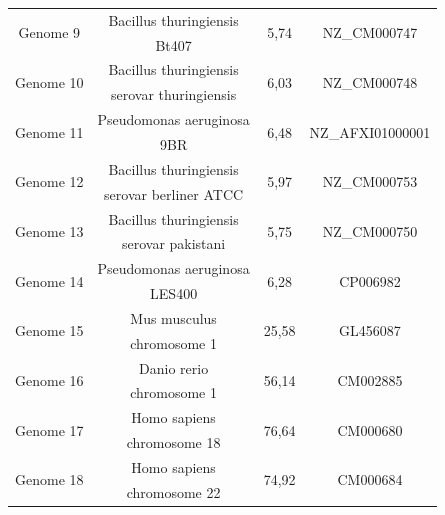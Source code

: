 \documentclass[preprint,12pt]{elsarticle}
\begin{document}
\begin{table}
\begin{center}
\begin{tabular}{c  c  c c}
\multirow{2}{*}{Genome 9}&Bacillus thuringiensis&   \multirow{2}{*}{5,74} &\multirow{2}{*}{ NZ\_CM000747 }\\    &Bt407&\\
\hline    

\multirow{2}{*}{Genome 10}&Bacillus thuringiensis& \multirow{2}{*}{6,03} &\multirow{2}{*}{ NZ\_CM000748}\\    &serovar thuringiensis& \\
\hline
    
\multirow{2}{*}{Genome 11}&Pseudomonas aeruginosa& \multirow{2}{*}{6,48} &\multirow{2}{*}{NZ\_AFXI01000001}\\    &9BR&\\
\hline
    
\multirow{2}{*}{Genome 12}&Bacillus thuringiensis&  \multirow{2}{*}{5,97} &\multirow{2}{*}{ NZ\_CM000753}\\    &serovar berliner ATCC &\\
\hline
    
\multirow{2}{*}{Genome 13}&Bacillus thuringiensis& \multirow{2}{*}{5,75} &\multirow{2}{*}{ NZ\_CM000750 }\\    &serovar pakistani&\\
\hline
    
\multirow{2}{*}{Genome 14}&Pseudomonas aeruginosa& \multirow{2}{*}{6,28} &\multirow{2}{*}{CP006982}\\    &LES400&\\
\hline

\multirow{2}{*}{Genome 15}& Mus musculus & \multirow{2}{*}{25,58} &\multirow{2}{*}{GL456087}\\  &chromosome 1&\\
\hline

\multirow{2}{*}{Genome 16}& Danio rerio & \multirow{2}{*}{56,14} &\multirow{2}{*}{CM002885}\\ & chromosome 1 &\\
\hline
\multirow{2}{*}{Genome 17}&Homo sapiens & \multirow{2}{*}{76,64 } &\multirow{2}{*}{  CM000680  }\\    & chromosome 18 &\\
\hline
\multirow{2}{*}{Genome 18}&Homo sapiens & \multirow{2}{*}{74,92} &\multirow{2}{*}{CM000684   }\\ & chromosome 22&\\
\hline
\bottomrule
\end{tabular}
\end{center}
\end{table} 
\end{document}
